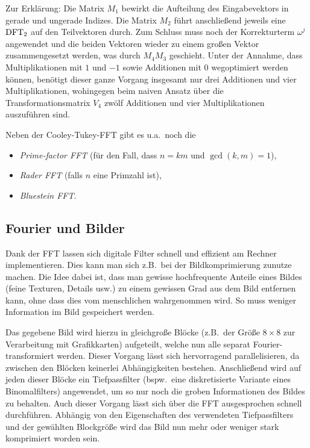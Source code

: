 Zur Erklärung: Die Matrix $ M_{1} $ bewirkt die Aufteilung des Eingabevektors in gerade und ungerade
Indizes. Die Matrix $ M_{2} $ führt anschließend jeweils eine $ \operatorname{DFT}_{2} $ auf den Teilvektoren 
durch. Zum Schluss muss noch der Korrekturterm $ \omega^{j} $ angewendet und die beiden Vektoren 
wieder zu einem großen Vektor zusammengesetzt werden, was durch $ M_{4}M_{3} $ geschieht. Unter der 
Annahme, dass Multiplikationen mit $ 1 $ und $ -1 $ sowie Additionen mit $ 0 $ wegoptimiert werden 
können, benötigt dieser ganze Vorgang insgesamt nur drei Additionen und vier Multiplikationen, 
wohingegen beim naiven Ansatz über die Transformationsmatrix $ V_{4} $ zwölf Additionen und vier 
Multiplikationen auszuführen sind.

Neben der Cooley-Tukey-FFT gibt es u.a.\ noch die
\begin{itemize}
\item \emph{Prime-factor FFT} (für den Fall, dass $ n = km $ und $ \gcd(k,m) = 1 $),
\item \emph{Rader FFT} (falls $ n $ eine Primzahl ist),
\item \emph{Bluestein FFT}.
\end{itemize}

\subsection{Fourier und Bilder}

Dank der FFT lassen sich digitale Filter schnell und effizient am Rechner implementieren. Dies kann
man sich z.B.\ bei der Bildkomprimierung zunutze machen. Die Idee dabei ist, dass man gewisse
hochfrequente Anteile eines Bildes (feine Texturen, Details usw.) zu einem gewissen Grad aus dem
Bild entfernen kann, ohne dass dies vom menschlichen wahrgenommen wird. So muss weniger Information
im Bild gespeichert werden.

Das gegebene Bild wird hierzu in gleichgroße Blöcke (z.B.\ der Größe $ 8 \times 8 $ zur 
Verarbeitung mit Grafikkarten) aufgeteilt, welche nun alle separat Fourier-transformiert werden.
Dieser Vorgang lässt sich hervorragend parallelisieren, da zwischen den Blöcken keinerlei 
Abhängigkeiten bestehen. Anschließend wird auf jeden dieser Blöcke ein Tiefpassfilter (bspw.\ eine 
diskretisierte Variante eines Binomalfilters) angewendet, um so nur noch die groben Informationen
des Bildes zu behalten. Auch dieser Vorgang lässt sich über die FFT ausgesprochen schnell 
durchführen. Abhängig von den Eigenschaften des verwendeten Tiefpassfilters und der gewählten 
Blockgröße wird das Bild nun mehr oder weniger stark komprimiert worden sein.

